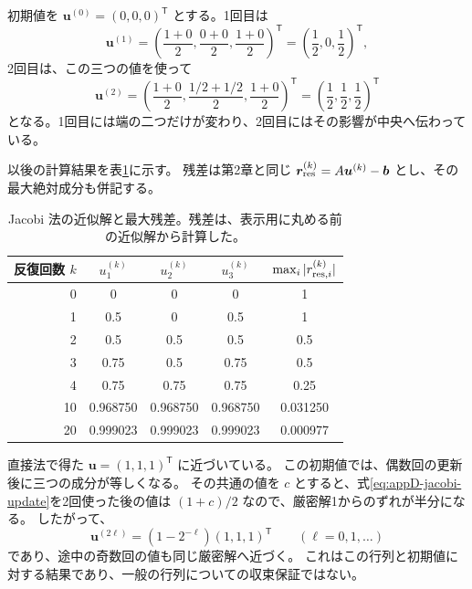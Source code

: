 初期値を $\boldsymbol u^{(0)}=(0,0,0)^{\mathsf T}$ とする。1回目は
\begin{equation*}
 \boldsymbol u^{(1)}
 =\left(\frac{1+0}{2},\frac{0+0}{2},\frac{1+0}{2}\right)^{\mathsf T}
 =\left(\frac12,0,\frac12\right)^{\mathsf T},
\end{equation*}
2回目は、この三つの値を使って
\begin{equation*}
 \boldsymbol u^{(2)}
 =\left(\frac{1+0}{2},\frac{1/2+1/2}{2},\frac{1+0}{2}\right)^{\mathsf T}
 =\left(\frac12,\frac12,\frac12\right)^{\mathsf T}
\end{equation*}
となる。1回目には端の二つだけが変わり、2回目にはその影響が中央へ伝わっている。

以後の計算結果を表\ref{tab:appD-jacobi}に示す。
残差は第2章と同じ $\boldsymbol r_{\rm res}^{(k)}=A\boldsymbol u^{(k)}-\boldsymbol b$ とし、その最大絶対成分も併記する。

\begin{table}[H]
\centering
\caption{Jacobi 法の近似解と最大残差。残差は、表示用に丸める前の近似解から計算した。}
\label{tab:appD-jacobi}
\renewcommand{\arraystretch}{1.12}
\begin{tabular}{rcccc}
\toprule
反復回数 $k$ & $u_1^{(k)}$ & $u_2^{(k)}$ & $u_3^{(k)}$ & $\max_i|r_{{\rm res},i}^{(k)}|$ \\
\midrule
0 & 0 & 0 & 0 & 1 \\
1 & 0.5 & 0 & 0.5 & 1 \\
2 & 0.5 & 0.5 & 0.5 & 0.5 \\
3 & 0.75 & 0.5 & 0.75 & 0.5 \\
4 & 0.75 & 0.75 & 0.75 & 0.25 \\
10 & 0.968750 & 0.968750 & 0.968750 & 0.031250 \\
20 & 0.999023 & 0.999023 & 0.999023 & 0.000977 \\
\bottomrule
\end{tabular}
\end{table}
直接法で得た $\boldsymbol u=(1,1,1)^{\mathsf T}$ に近づいている。
この初期値では、偶数回の更新後に三つの成分が等しくなる。
その共通の値を $c$ とすると、式\eqref{eq:appD-jacobi-update}を2回使った後の値は $(1+c)/2$ なので、厳密解1からのずれが半分になる。
したがって、
\begin{equation}
 \boldsymbol u^{(2\ell)}=(1-2^{-\ell})(1,1,1)^{\mathsf T}\qquad(\ell=0,1,\ldots)
\label{eq:appD-jacobi-even}
\end{equation}
であり、途中の奇数回の値も同じ厳密解へ近づく。
これはこの行列と初期値に対する結果であり、一般の行列についての収束保証ではない。

